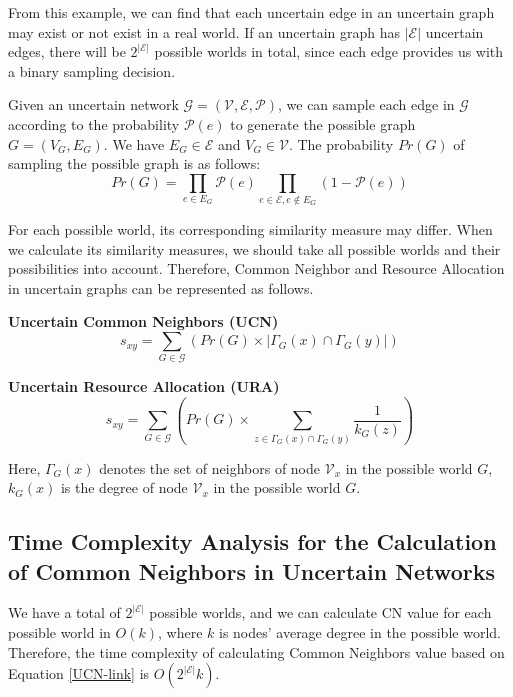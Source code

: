 \documentclass[\main/thesis.tex]{subfiles}
\begin{document}
From this example, we can find that each uncertain edge in an uncertain graph may exist or not exist in a real world. If an uncertain graph has $|\mathcal{E}|$ uncertain edges, there will be $2^{|\mathcal{E}|}$ possible worlds in total, since each edge provides us with a binary sampling decision.

Given an uncertain network $\mathcal{G = (V,E,P)}$, we can sample each edge in $\mathcal{G}$ according to the probability $\mathcal{P}(e)$ to generate the possible graph $G = (V_G,E_G)$. We have $E_G \in \mathcal{E}$ and $V_G \in \mathcal{V}$. The probability $Pr(G)$ of sampling the possible graph is as follows:
\begin{equation}
Pr(G) = \prod_{e\in E_G}\mathcal{P}(e)\prod_{e\in \mathcal{E}, e\notin E_G}(1-\mathcal{P}(e))
\label{probability-of-possible-world}
\end{equation}

For each possible world, its corresponding similarity measure may differ. When we calculate its similarity measures, we should take all possible worlds and their possibilities into account. Therefore, Common Neighbor and Resource Allocation in uncertain graphs can be represented as follows.

\textbf{Uncertain Common Neighbors (UCN)}
\begin{equation}
s_{xy}=\sum_{G\in \mathcal{G}}( Pr(G)\times|\Gamma_G(x)\cap\Gamma_G(y)|) \label{UCN-link}
\end{equation}

\textbf{Uncertain Resource Allocation (URA)}
\begin{equation}
s_{xy}=\sum_{G\in \mathcal{G}}( Pr(G)\times\sum_{z\in \Gamma_G(x)\cap\Gamma_G(y)}\frac{1}{k_G(z)}) \label{URA-link}
\end{equation}

Here, $\Gamma_G(x)$ denotes the set of neighbors of node $\mathcal{V}_x$ in the possible world $G$, $k_G(x)$ is the degree of node $\mathcal{V}_x$ in the possible world $G$.

\subsection{Time Complexity Analysis for the Calculation of Common Neighbors in Uncertain Networks} \label{CN-Complexity-Analysis}
We have a total of $2^{|\mathcal{E}|}$ possible worlds, and we can calculate CN value for each possible world in $O(k)$, where $k$ is nodes' average degree in the possible world. Therefore, the time complexity of calculating Common Neighbors value based on Equation \ref{UCN-link} is $O(2^{|\mathcal{E}|}k)$.
\end{document}

